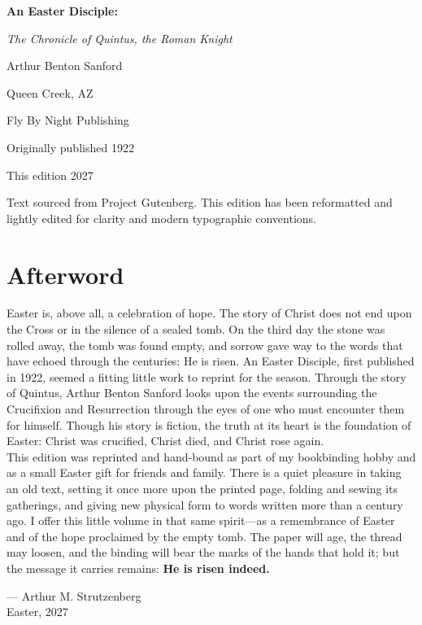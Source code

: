 \documentclass[11pt,twoside,openany]{book}
\newcommand{\BookTitle}{An Easter Disciple:}
\newcommand{\BookSubtitle}{The Chronicle of Quintus, the Roman Knight}
\newcommand{\BookAuthor}{Arthur Benton Sanford}
\newcommand{\PublisherName}{Fly By Night Publishing}
\newcommand{\PublisherCity}{Queen Creek, AZ}
\newcommand{\EditionNote}{Text sourced from Project Gutenberg. This edition has been reformatted and lightly edited for clarity and modern typographic conventions.}
\newcommand{\OriginalPubYear}{1922}   %
\newcommand{\ThisEditionYear}{2027}   %
\newcommand{\BookTitlePage}{%
\thispagestyle{empty}

\vspace*{2cm}

\begin{center}

{\Huge\bfseries \BookTitle \par}
\vspace{0.5em}

{\Large\itshape \BookSubtitle \par}

\vspace{2.5cm}

{\Large \BookAuthor \par}

\vfill

{\small
\PublisherCity \par
\PublisherName \par
\vspace{1em}
Originally published \OriginalPubYear \par
This edition \ThisEditionYear
}

\end{center}

\clearpage
}
\begin{document}
\frontmatter
\BookTitlePage

\clearpage
\thispagestyle{empty}
\vspace*{\fill}

\begin{center}
\small
\EditionNote
\end{center}

\clearpage

\mainmatter








\backmatter
\chapter*{Afterword}

\indent Easter is, above all, a celebration of hope. The story of Christ does not end upon the Cross or in the silence of a sealed tomb. On the third day the stone was rolled away, the tomb was found empty, and sorrow gave way to the words that have echoed through the centuries: He is risen. An Easter Disciple, first published in 1922, seemed a fitting little work to reprint for the season. Through the story of Quintus, Arthur Benton Sanford looks upon the events surrounding the Crucifixion and Resurrection through the eyes of one who must encounter them for himself. Though his story is fiction, the truth at its heart is the foundation of Easter: Christ was crucified, Christ died, and Christ rose again.\\

\indent This edition was reprinted and hand-bound as part of my bookbinding hobby and as a small Easter gift for friends and family. There is a quiet pleasure in taking an old text, setting it once more upon the printed page, folding and sewing its gatherings, and giving new physical form to words written more than a century ago. I offer this little volume in that same spirit—as a remembrance of Easter and of the hope proclaimed by the empty tomb. The paper will age, the thread may loosen, and the binding will bear the marks of the hands that hold it; but the message it carries remains: \textbf{He is risen indeed.}

\vspace{1.25em}

\noindent
--- Arthur M. Strutzenberg\\
Easter, 2027
\end{document}
